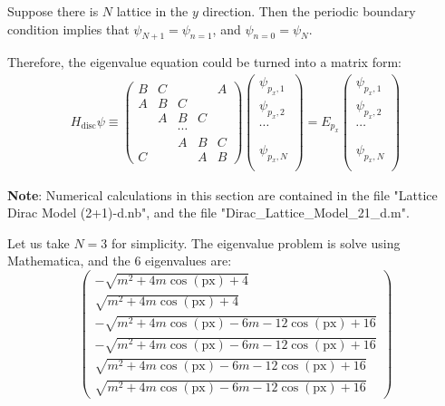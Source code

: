 \documentclass{article}
\begin{document}
Suppose there is $N$ lattice in the $y$ direction. Then the periodic
boundary condition implies that $\psi_{N+1}=\psi_{n=1}$, and
$\psi_{n=0} = \psi_N$.

Therefore, the eigenvalue equation could be turned into a matrix form:
\begin{align}
    H_{\text{disc}} \psi \equiv 
    \begin{pmatrix}
        B   & C &        &   & A \\
        A   & B & C      &   & \\
            & A & B      & C & \\
            &   & \cdots &   & \\
            &   & A      & B & C \\
        C   &   &        & A & B
    \end{pmatrix}
    \begin{pmatrix}
        \psi_{p_x,1} \\
        \psi_{p_x,2} \\
        \cdots \\
        \\
        \\
        \psi_{p_x,N} \\
    \end{pmatrix} =
    E_{p_x}
    \begin{pmatrix}
        \psi_{p_x,1} \\
        \psi_{p_x,2} \\
        \cdots \\
        \\
        \\
        \psi_{p_x,N} \\
    \end{pmatrix}
\end{align}

\textbf{Note}: Numerical calculations in this section are contained in the file
"Lattice Dirac Model (2+1)-d.nb", and the file
"Dirac\_Lattice\_Model\_21\_d.m".

Let us take $N=3$ for simplicity. The eigenvalue problem is solve
using Mathematica, and the $6$ eigenvalues are:
\begin{equation}
    \begin{pmatrix}
    -\sqrt{m^2+4 m \cos (\text{px})+4}\\
    \sqrt{m^2+4 m \cos (\text{px})+4}\\
    -\sqrt{m^2+4 m \cos (\text{px})-6 m-12 \cos (\text{px})+16}\\
    -\sqrt{m^2+4 m \cos (\text{px})-6 m-12 \cos (\text{px})+16}\\
    \sqrt{m^2+4 m \cos (\text{px})-6 m-12 \cos (\text{px})+16}\\
    \sqrt{m^2+4 m \cos (\text{px})-6 m-12 \cos (\text{px})+16}
    \end{pmatrix}
\end{equation}
\end{document}
